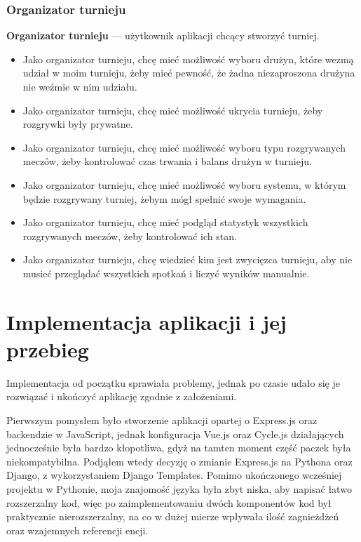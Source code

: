 \documentclass[shortabstract]{iithesis}
\theoremstyle{definition} \newtheorem{definition}{Definicja}[]
\theoremstyle{remark} \newtheorem{remark}[definition]{Observation}
\theoremstyle{plain} \newtheorem{theorem}[definition]{Theorem}
\theoremstyle{plain} \newtheorem{lemma}[definition]{Lemma}
\begin{document}
\subsection{Organizator turnieju}
\textbf{Organizator turnieju} --- użytkownik aplikacji chcący stworzyć turniej.

\begin{itemize}
    \item Jako organizator turnieju, chcę mieć możliwość wyboru drużyn, które wezmą udział w moim turnieju, żeby mieć pewność, że żadna niezaproszona drużyna nie weźmie w nim udziału.
    \item Jako organizator turnieju, chcę mieć możliwość ukrycia turnieju, żeby rozgrywki były prywatne.
    \item Jako organizator turnieju, chcę mieć możliwość wyboru typu rozgrywanych meczów, żeby kontrolować czas trwania i balans drużyn w turnieju.
    \item Jako organizator turnieju, chcę mieć możliwość wyboru systemu, w którym będzie rozgrywany turniej, żebym mógł spełnić swoje wymagania.
    \item Jako organizator turnieju, chcę mieć podgląd statystyk wszystkich rozgrywanych meczów, żeby kontrolować ich stan.
    \item Jako organizator turnieju, chcę wiedzieć kim jest zwycięzca turnieju, aby nie musieć przeglądać wszystkich spotkań i liczyć wyników manualnie.
\end{itemize}


\chapter{Implementacja aplikacji i jej przebieg}
Implementacja od początku sprawiała problemy, jednak po czasie udało się je rozwiązać i ukończyć aplikację zgodnie z założeniami.

Pierwszym pomysłem było stworzenie aplikacji opartej o Express.js oraz backendzie w JavaScript, jednak konfiguracja Vue.js oraz Cycle.js działających jednocześnie była bardzo kłopotliwa, gdyż na tamten moment część paczek była niekompatybilna. Podjąłem wtedy decyzję o zmianie Express.js na Pythona oraz Django, z wykorzystaniem Django Templates. Pomimo ukończonego wcześniej projektu w Pythonie, moja znajomość języka była zbyt niska, aby napisać łatwo rozszerzalny kod, więc po zaimplementowaniu dwóch komponentów kod był praktycznie nierozszerzalny, na co w dużej mierze wpływała ilość zagnieżdżeń oraz wzajemnych referencji encji.
\end{document}
